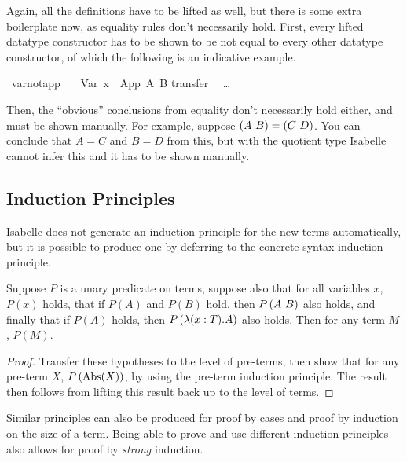 Again, all the definitions have to be lifted as well, but there is some extra boilerplate now, as equality rules don't necessarily hold.
First, every lifted datatype constructor has to be shown to be not equal to every other datatype constructor, of which the following is an indicative example.

\begin{implementation}
\isamarkupfalse%
\ var{\isacharunderscore}not{\isacharunderscore}app{\isacharcolon}\isanewline
\ \ \ {\isachardoublequoteopen}Var\ x\ {\isasymnoteq}\ App\ A\ B{\isachardoublequoteclose}\isanewline
%
\isadelimproof
%
\endisadelimproof
%
\isatagproof
{}\isamarkupfalse%
{\isacharparenleft}transfer{\isacharparenright}\isanewline
\ \ \ldots\isanewline
{}\isamarkupfalse%
%
\endisatagproof
\end{implementation}

Then, the ``obvious'' conclusions from equality don't necessarily hold either, and must be shown manually.
For example, suppose \(\left(A\ B\right) = \left(C\ D\right)\).
You can conclude that \(A = C\) and \(B = D\) from this, but with the quotient type Isabelle cannot infer this and it has to be shown manually.

\subsection{Induction Principles}
Isabelle does not generate an induction principle for the new terms automatically, but it is possible to produce one by deferring to the concrete-syntax induction principle.

\begin{lemma}
Suppose \(P\) is a unary predicate on terms, suppose also that for all variables \(x\), \(P(x)\) holds, that if \(P(A)\) and \(P(B)\) hold, then \(P\left(A\ B\right)\) also holds, and finally that if \(P(A)\) holds, then \(P\left(\lambda (x:T). A\right)\) also holds.
Then for any term \(M\), \(P(M)\).
\end{lemma}
\begin{proof}
Transfer these hypotheses to the level of pre-terms, then show that for any pre-term \(X\), \(P\left(\textrm{Abs}(X)\right)\), by using the pre-term induction principle.
The result then follows from lifting this result back up to the level of terms.
\end{proof}

Similar principles can also be produced for proof by cases and proof by induction on the size of a term.
Being able to prove and use different induction principles also allows for proof by \emph{strong} induction.

